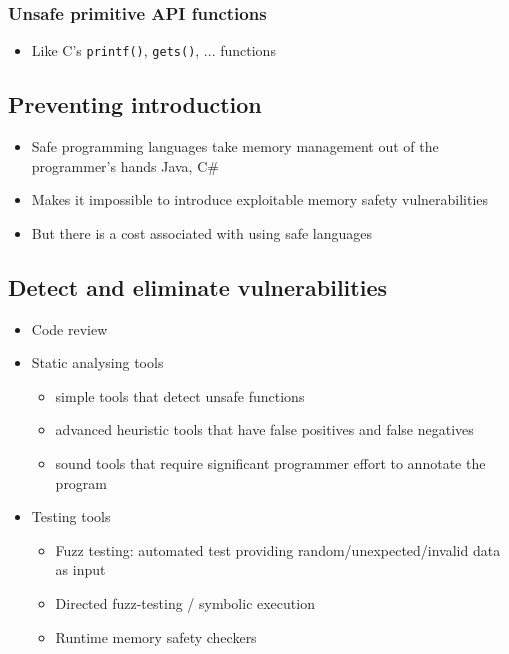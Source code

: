 \documentclass[12pt,titlepage,a4paper]{report}
\begin{document}
				\subsubsection{Unsafe primitive API functions}
					\begin{itemize}
						\item Like C's \texttt{printf()}, \texttt{gets()}, ... functions
					\end{itemize}
			
			\subsection{Preventing introduction}
				\begin{itemize}
					\item Safe programming languages take memory management out of the programmer's hands
						\subitem Java, C\#
					\item Makes it impossible to introduce exploitable memory safety vulnerabilities
					\item But there is a cost associated with using safe languages
				\end{itemize}
			
			\subsection{Detect and eliminate vulnerabilities}
				\begin{itemize}
					\item Code review
					\item Static analysing tools
					\begin{itemize}
						\item simple tools that detect unsafe functions
						\item advanced heuristic tools that have false positives and false negatives
						\item sound tools that require significant programmer effort to annotate the program
					\end{itemize}
					\item Testing tools
					\begin{itemize}
						\item Fuzz testing: automated test providing random/unexpected/invalid data as input
						\item Directed fuzz-testing / symbolic execution
						\item Runtime memory safety checkers
					\end{itemize}
				\end{itemize}
		
\end{document}
